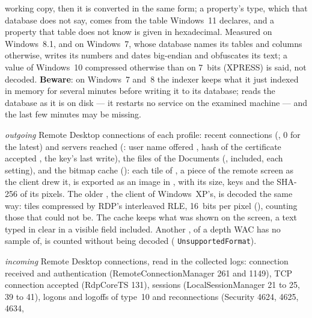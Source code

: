 \documentclass[11pt,a4paper,oneside]{report}
\begin{document}
\begin{description}[style=nextline,leftmargin=1.2em]
        working copy, then it is converted in the same form; a property's
        type, which that database does not say, comes from the table
        Windows~11 declares, and a property that table does not know is given
        in hexadecimal. Measured on Windows~8.1, and on Windows~7, whose
        database names its tables and columns otherwise, writes its numbers
        and dates big-endian and obfuscates its text; a value of Windows~10
        compressed otherwise than on 7~bits (XPRESS) is said, not decoded.
        \textbf{Beware}: on Windows~7 and~8 the indexer keeps what it just indexed
        in memory for several minutes before writing it to its database;
        \wac{} reads the database as it is on disk --- it restarts no service
        on the examined machine --- and the last few minutes may be missing.
  \item[\fichier{rdp\_client.json}] \emph{outgoing} Remote Desktop connections of
        each profile: recent connections (,
         0 for the latest) and servers reached
        (: user name offered , hash of the
        certificate accepted , the key's last write), the
         files of the Documents (,
         included, each setting), and the bitmap cache
        (): each tile of , a piece of the
        remote screen as the client drew it, is exported as an image in
        , with its
        size, keys and the SHA-256 of its pixels. The older
        , the client of Windows~XP's, is decoded the
        same way: tiles compressed by RDP's interleaved RLE, 16~bits per pixel
        (),  counting those that could
        not be. The cache keeps what was shown on the screen, a text typed in
        clear in a visible field included. Another , of a depth
        WAC has no sample of, is counted without being decoded
        ( \texttt{UnsupportedFormat}).
  \item[\fichier{rdp\_server.json}] \emph{incoming} Remote Desktop connections,
        read in the collected logs: connection received and authentication
        (RemoteConnectionManager 261 and 1149), TCP connection accepted
        (RdpCoreTS 131), sessions (LocalSessionManager 21 to 25, 39 to 41), logons
        and logoffs of type~10 and reconnections (Security 4624, 4625, 4634,

\end{description}
\end{document}
